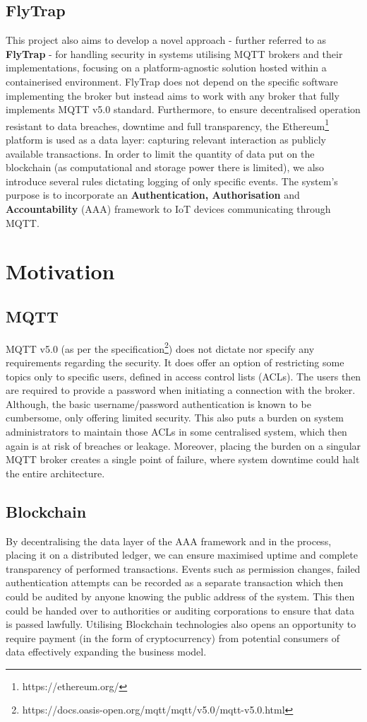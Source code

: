 \subsection{FlyTrap}
This project also aims to develop a novel approach - further referred to as \textbf{FlyTrap} - for handling security in systems utilising MQTT brokers and their implementations, focusing on a platform-agnostic solution hosted within a containerised environment. FlyTrap does not depend on the specific software implementing the broker but instead aims to work with any broker that fully implements MQTT v5.0 standard. Furthermore, to ensure decentralised operation resistant to data breaches, downtime and full transparency, the Ethereum\footnote{https://ethereum.org/} platform is used as a data layer: capturing relevant interaction as publicly available transactions. In order to limit the quantity of data put on the blockchain (as computational and storage power there is limited), we also introduce several rules dictating logging of only specific events. The system's purpose is to incorporate an \textbf{Authentication, Authorisation} and \textbf{Accountability} (AAA) framework to IoT devices communicating through MQTT.

\section{Motivation}

\subsection{MQTT}
MQTT v5.0 (as per the specification\footnote{https://docs.oasis-open.org/mqtt/mqtt/v5.0/mqtt-v5.0.html}) does not dictate nor specify any requirements regarding the security. It does offer an option of restricting some topics only to specific users, defined in access control lists (ACLs). The users then are required to provide a password when initiating a connection with the broker. Although, the basic username/password authentication is known to be cumbersome, only offering limited security. This also puts a burden on system administrators to maintain those ACLs in some centralised system, which then again is at risk of breaches or leakage. Moreover, placing the burden on a singular MQTT broker creates a single point of failure, where system downtime could halt the entire architecture.
\subsection{Blockchain}
By decentralising the data layer of the AAA framework and in the process, placing it on a distributed ledger, we can ensure maximised uptime and complete transparency of performed transactions. Events such as permission changes, failed authentication attempts can be recorded as a separate transaction which then could be audited by anyone knowing the public address of the system. This then could be handed over to authorities or auditing corporations to ensure that data is passed lawfully. Utilising Blockchain technologies also opens an opportunity to require payment (in the form of cryptocurrency) from potential consumers of data effectively expanding the business model. 
